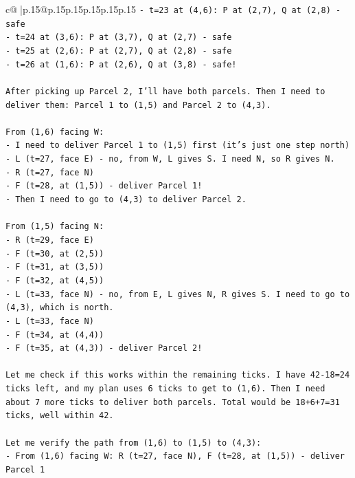 \documentclass{article}
\begin{document}
{\begin{supertabular}{c@{$\;$}|p{.15\linewidth}@{}p{.15\linewidth}p{.15\linewidth}p{.15\linewidth}p{.15\linewidth}p{.15\linewidth}}
{{{\texttt{{-} t=23 at (4,6): P at (2,7), Q at (2,8) {-} safe} \\
\texttt{{-} t=24 at (3,6): P at (3,7), Q at (2,7) {-} safe} \\
\texttt{{-} t=25 at (2,6): P at (2,7), Q at (2,8) {-} safe} \\
\texttt{{-} t=26 at (1,6): P at (2,6), Q at (3,8) {-} safe!} \\
\\ 
\texttt{After picking up Parcel 2, I'll have both parcels. Then I need to deliver them: Parcel 1 to (1,5) and Parcel 2 to (4,3).} \\
\\ 
\texttt{From (1,6) facing W:} \\
\texttt{{-} I need to deliver Parcel 1 to (1,5) first (it's just one step north)} \\
\texttt{{-} L (t=27, face E) {-} no, from W, L gives S. I need N, so R gives N.} \\
\texttt{{-} R (t=27, face N)} \\
\texttt{{-} F (t=28, at (1,5)) {-} deliver Parcel 1!} \\
\texttt{{-} Then I need to go to (4,3) to deliver Parcel 2.} \\
\\ 
\texttt{From (1,5) facing N:} \\
\texttt{{-} R (t=29, face E)} \\
\texttt{{-} F (t=30, at (2,5))} \\
\texttt{{-} F (t=31, at (3,5))} \\
\texttt{{-} F (t=32, at (4,5))} \\
\texttt{{-} L (t=33, face N) {-} no, from E, L gives N, R gives S. I need to go to (4,3), which is north.} \\
\texttt{{-} L (t=33, face N)} \\
\texttt{{-} F (t=34, at (4,4))} \\
\texttt{{-} F (t=35, at (4,3)) {-} deliver Parcel 2!} \\
\\ 
\texttt{Let me check if this works within the remaining ticks. I have 42{-}18=24 ticks left, and my plan uses 6 ticks to get to (1,6). Then I need about 7 more ticks to deliver both parcels. Total would be 18+6+7=31 ticks, well within 42.} \\
\\ 
\texttt{Let me verify the path from (1,6) to (1,5) to (4,3):} \\
\texttt{{-} From (1,6) facing W: R (t=27, face N), F (t=28, at (1,5)) {-} deliver Parcel 1} \\
}}}
\end{supertabular}}
\end{document}
